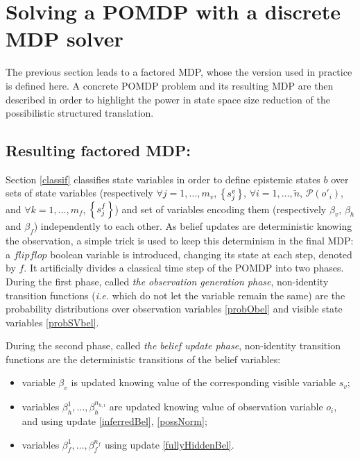 \section{Solving a POMDP with a discrete MDP solver}
The previous section leads to a factored MDP, whose the version used in practice is defined here.
A concrete POMDP problem and its resulting MDP are then described in order to highlight
the power in state space size reduction of the possibilistic structured translation.
\subsection{Resulting factored MDP:}
Section \ref{classif} classifies state variables in order to define epistemic states $b$
over sets of state variables (respectively $\forall j=1,\ldots,m_v$, $\left\{ \left. s^v_j \right. \right\}$, 
$\forall i=1,\ldots,\tilde{n}$, $\mathcal{P}(o'_i)$, and $\forall k=1,\ldots,m_f$, 
$\left\{ \left.  s^f_j  \right. \right\}$) and set of variables encoding them (respectively $\beta_v$, $\beta_h$ and  
$\beta_f$) independently to each other. As belief updates are deterministic knowing the
observation, a simple trick is used to keep this determinism in the final MDP:
a $flipflop$ boolean variable is introduced, changing its state at each step, denoted
by $f$. It
artificially divides a classical time step of the POMDP into two phases.
During the first phase, called \textit{the observation generation phase}, 
non-identity transition functions 
(\textit{i.e.} which do not let the variable remain the same)
are the probability distributions over observation variables \ref{probObel}
and visible state variables \ref{probSVbel}.

During the second phase, called \textit{the belief update phase}, 
non-identity transition functions are
the deterministic transitions of the belief variables:
\begin{itemize}
\item variable $\beta_v$ is updated knowing value of the corresponding visible variable $s_v$;
\item variables $\beta^{1}_{h}, \ldots, \beta^{n_{h,i}}_h$ are updated knowing value of observation variable $o_i$, 
and using update \ref{inferredBel}, \ref{possNorm};
\item variables $\beta^{1}_{f}, \ldots, \beta^{n_{f}}_f$ using update \ref{fullyHiddenBel}.
\end{itemize}

